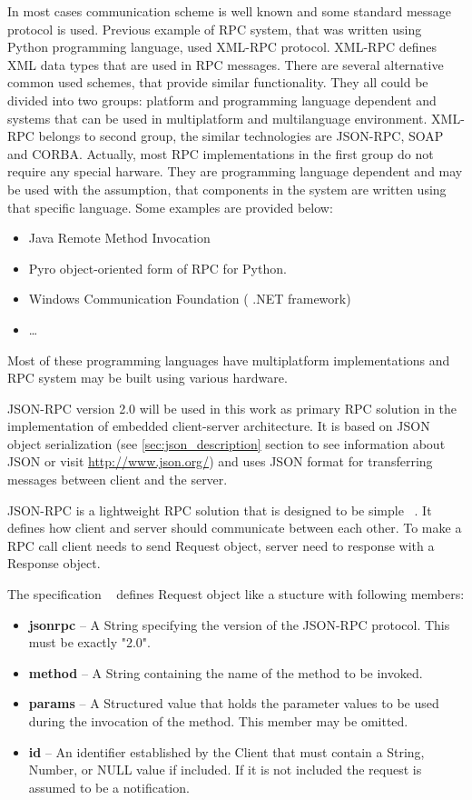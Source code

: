 In most cases communication scheme is well known and some standard
message protocol is used. Previous example of RPC system, that was written using
Python programming language, used XML-RPC protocol. XML-RPC defines XML data
types that are used in RPC messages. There are several alternative common used
schemes, that provide similar functionality. They all could be divided into
two groups: platform and programming language dependent and systems that  
can be used in multiplatform and multilanguage environment. XML-RPC belongs to
second group, the similar technologies are JSON-RPC, SOAP and CORBA.
Actually, most RPC implementations in the first group do not require any special
harware. They are programming language dependent and may be used with
the assumption, that components in the system are written using that specific
language. Some examples are provided below:
\begin{itemize}
  \item Java Remote Method Invocation
  \item Pyro object-oriented form of RPC for Python.
  \item Windows Communication Foundation ( .NET framework)
  \item \ldots   
\end{itemize} 
Most of these programming languages have multiplatform implementations and RPC
system may be built using various hardware.

JSON-RPC version 2.0 will be used in this work as primary RPC solution in the implementation of embedded client-server architecture. 
It is based on \gls{JSON} object serialization (see \ref{sec:json_description} section to see information about JSON or visit \url{http://www.json.org/})
and uses JSON format for  transferring messages between client and the server.

JSON-RPC is a lightweight RPC solution that is designed to be simple ~\cite{jsonrpc_spec}.
It defines how client and server should communicate between each other. 
To make a RPC call client needs to send Request object, server need to response with a Response object.

The specification ~\cite{jsonrpc_spec} defines Request object like a stucture with following members:
\begin{itemize}
\item \textbf{jsonrpc} -- A String specifying the version of the JSON-RPC protocol. This must be exactly "2.0".
\item \textbf{method} -- A String containing the name of the method to be invoked.
\item \textbf{params} -- A Structured value that holds the parameter values to be used during the invocation of the method. This member may be omitted.
\item \textbf{id} --  An identifier established by the Client that must contain a String, Number, or NULL value if included. If it is not included the request is assumed to be a notification. 
\end{itemize}

